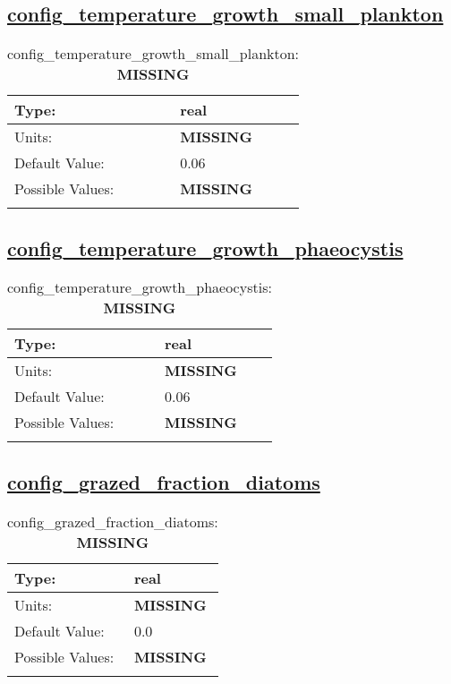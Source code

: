 \subsection[config\_temperature\_growth\_small\_plankton]{\hyperref[sec:nm_tab_biogeochemistry]{config\_temperature\_growth\_small\_plankton}}
\label{subsec:nm_sec_config_temperature_growth_small_plankton}
\begin{center}
\begin{longtable}{| p{2.0in} || p{4.0in} |}
    \hline
    Type: & real \\
    \hline
    Units: & {\bf \color{red} MISSING} \\
    \hline
    Default Value: & 0.06 \\
    \hline
    Possible Values: & {\bf \color{red} MISSING} \\
    \hline
    \caption{config\_temperature\_growth\_small\_plankton: {\bf \color{red} MISSING}}
\end{longtable}
\end{center}
\subsection[config\_temperature\_growth\_phaeocystis]{\hyperref[sec:nm_tab_biogeochemistry]{config\_temperature\_growth\_phaeocystis}}
\label{subsec:nm_sec_config_temperature_growth_phaeocystis}
\begin{center}
\begin{longtable}{| p{2.0in} || p{4.0in} |}
    \hline
    Type: & real \\
    \hline
    Units: & {\bf \color{red} MISSING} \\
    \hline
    Default Value: & 0.06 \\
    \hline
    Possible Values: & {\bf \color{red} MISSING} \\
    \hline
    \caption{config\_temperature\_growth\_phaeocystis: {\bf \color{red} MISSING}}
\end{longtable}
\end{center}
\subsection[config\_grazed\_fraction\_diatoms]{\hyperref[sec:nm_tab_biogeochemistry]{config\_grazed\_fraction\_diatoms}}
\label{subsec:nm_sec_config_grazed_fraction_diatoms}
\begin{center}
\begin{longtable}{| p{2.0in} || p{4.0in} |}
    \hline
    Type: & real \\
    \hline
    Units: & {\bf \color{red} MISSING} \\
    \hline
    Default Value: & 0.0 \\
    \hline
    Possible Values: & {\bf \color{red} MISSING} \\
    \hline
    \caption{config\_grazed\_fraction\_diatoms: {\bf \color{red} MISSING}}
\end{longtable}
\end{center}
